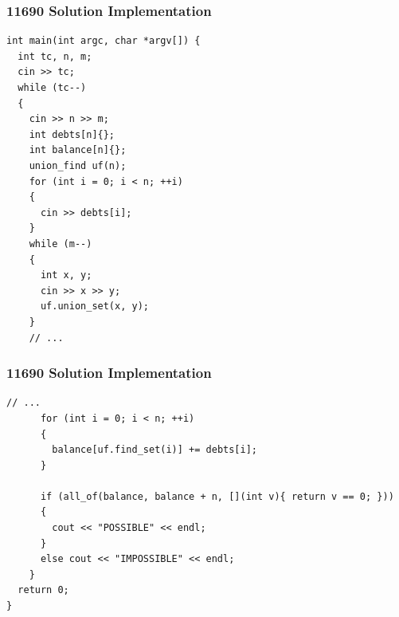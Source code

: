 \documentclass{beamer}
\begin{document}
\ifanswers

\begin{frame}[containsverbatim]
\frametitle{11690 Solution Implementation}

\scriptsize

\begin{lstlisting}[mathescape]
int main(int argc, char *argv[]) {
  int tc, n, m;
  cin >> tc;
  while (tc--)
  {
    cin >> n >> m;
    int debts[n]{};
    int balance[n]{};
    union_find uf(n);
    for (int i = 0; i < n; ++i)
    {
      cin >> debts[i];
    }
    while (m--)
    {
      int x, y;
      cin >> x >> y;
      uf.union_set(x, y);
    }
    // ...
\end{lstlisting}

\end{frame}

\begin{frame}[containsverbatim]
\frametitle{11690 Solution Implementation}

\scriptsize

\begin{lstlisting}[mathescape]
      // ...
      for (int i = 0; i < n; ++i)
      {
        balance[uf.find_set(i)] += debts[i];
      }

      if (all_of(balance, balance + n, [](int v){ return v == 0; }))
      {
        cout << "POSSIBLE" << endl;
      }
      else cout << "IMPOSSIBLE" << endl;
    }
  return 0;
}
\end{lstlisting}

\end{frame}

\end{document}
